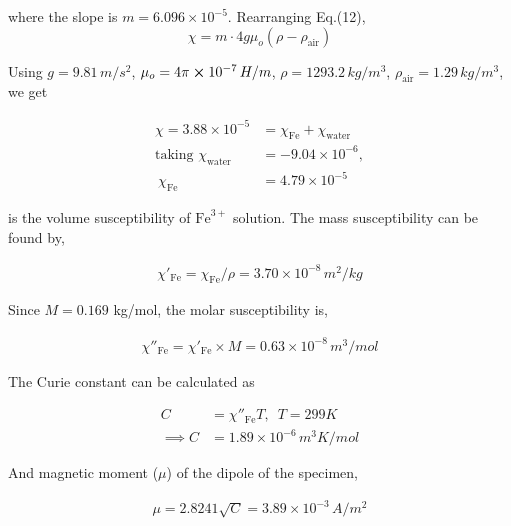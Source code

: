     where the slope is $m=6.096\times10^{-5}$. Rearranging Eq.(12), 
    \begin{equation*}
        \chi = m\cdot4g\mu_o(\rho - \rho_\text{air})
    \end{equation*}

    Using $g=9.81\,m/s^2$, $\mu_o=4\pi\cross10^{-7}\,H/m$, $\rho=1293.2\,kg/m^3$, $\rho_\text{air}=1.29\,kg/m^3$, we get

    \begin{align*}
        \chi = 3.88 \times 10^{-5} &= \chi_\text{Fe} + \chi_\text{water}\\
        \text{taking }\chi_\text{water}&=-9.04\times10^{-6},\\\
        \chi_\text{Fe} &= 4.79\times10^{-5}
    \end{align*}

    is the volume susceptibility of $\text{Fe}^{3+}$ solution. The mass susceptibility can be found by,

    \begin{align*}
        \chi'_\text{Fe} = \chi_\text{Fe}/\rho = 3.70\times10^{-8}\,m^2/kg
    \end{align*}

    Since $M = 0.169$ kg/mol, the molar susceptibility is,

    \begin{align*}
        \chi''_\text{Fe} = \chi'_\text{Fe}\times M = 0.63\times10^{-8}\,m^3/mol
    \end{align*}

    The Curie constant can be calculated as

    \begin{align*}
        C &= \chi''_\text{Fe}T,\,\,\, T=299K \\
        \implies C &= 1.89\times10^{-6}\,m^3 K/mol
    \end{align*}

    And magnetic moment ($\mu$) of the dipole of the specimen,

    \begin{align*}
       \mu = 2.8241\sqrt{C} = 3.89\times10^{-3}\,A/m^2
    \end{align*}


